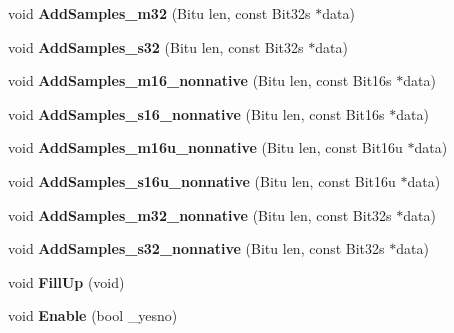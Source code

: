 \begin{DoxyCompactItemize}
\item 
\hypertarget{classMixerChannel_a8f6f70528e13e637403e8fc368867c97}{void {\bfseries Add\-Samples\-\_\-m32} (Bitu len, const Bit32s $\ast$data)}\label{classMixerChannel_a8f6f70528e13e637403e8fc368867c97}

\item 
\hypertarget{classMixerChannel_a2eec58265bd8e3f3996468a73e80e19f}{void {\bfseries Add\-Samples\-\_\-s32} (Bitu len, const Bit32s $\ast$data)}\label{classMixerChannel_a2eec58265bd8e3f3996468a73e80e19f}

\item 
\hypertarget{classMixerChannel_a10a0164e8e238c967190e9536c2b71cc}{void {\bfseries Add\-Samples\-\_\-m16\-\_\-nonnative} (Bitu len, const Bit16s $\ast$data)}\label{classMixerChannel_a10a0164e8e238c967190e9536c2b71cc}

\item 
\hypertarget{classMixerChannel_a1ce7497712bc86d40a16865993636bd8}{void {\bfseries Add\-Samples\-\_\-s16\-\_\-nonnative} (Bitu len, const Bit16s $\ast$data)}\label{classMixerChannel_a1ce7497712bc86d40a16865993636bd8}

\item 
\hypertarget{classMixerChannel_ab7074c96bd7c25d9ca33509c944faa61}{void {\bfseries Add\-Samples\-\_\-m16u\-\_\-nonnative} (Bitu len, const Bit16u $\ast$data)}\label{classMixerChannel_ab7074c96bd7c25d9ca33509c944faa61}

\item 
\hypertarget{classMixerChannel_ab638e9ff862c19e43b82218879854cb0}{void {\bfseries Add\-Samples\-\_\-s16u\-\_\-nonnative} (Bitu len, const Bit16u $\ast$data)}\label{classMixerChannel_ab638e9ff862c19e43b82218879854cb0}

\item 
\hypertarget{classMixerChannel_ab590ebd5d99f20882b4e013932f46284}{void {\bfseries Add\-Samples\-\_\-m32\-\_\-nonnative} (Bitu len, const Bit32s $\ast$data)}\label{classMixerChannel_ab590ebd5d99f20882b4e013932f46284}

\item 
\hypertarget{classMixerChannel_a9283464a784a81c0548c45d9c5375b32}{void {\bfseries Add\-Samples\-\_\-s32\-\_\-nonnative} (Bitu len, const Bit32s $\ast$data)}\label{classMixerChannel_a9283464a784a81c0548c45d9c5375b32}

\item 
\hypertarget{classMixerChannel_ade749a4f846a0f69c223f541e761cefe}{void {\bfseries Fill\-Up} (void)}\label{classMixerChannel_ade749a4f846a0f69c223f541e761cefe}

\item 
\hypertarget{classMixerChannel_a3c9dfb6c96a54fbcbd420a5e94071b00}{void {\bfseries Enable} (bool \-\_\-yesno)}\label{classMixerChannel_a3c9dfb6c96a54fbcbd420a5e94071b00}

\end{DoxyCompactItemize}
